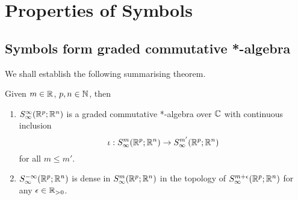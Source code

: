 \documentclass[12pt]{article}
\begin{document}



\section{Properties of Symbols}

\subsection{Symbols form graded commutative *-algebra} 
We shall establish the following summarising theorem. 
\begin{ftheorem}[Summary] \label{theorem : summary for symbol properties}
    Given $m \in {\ensuremath {\mathbb R}}$, $p, n \in {\ensuremath {\mathbb N}}$, then
    \begin{enumerate}
        \item $S^{\infty}_\infty({\mathbb R}^{p}; {\mathbb R}^n)$ is a graded commutative *-algebra over ${\mathbb C}$ with continuous  inclusion  $$\iota : S^{m}_\infty({\mathbb R}^p; {\mathbb R}^n) \to S^{m'}_\infty({\mathbb R}^p; {\mathbb R}^n)$$ for all $m \leq m'$. 
        \item $S^{-\infty}_\infty({\mathbb R}^{p}; {\mathbb R}^n)$ is dense in $S^{m}_\infty({\mathbb R}^{p}; {\mathbb R}^n)$ in the topology of $S^{m + \epsilon}_\infty({\mathbb R}^{p}; {\mathbb R}^n)$ for any $\epsilon \in {\ensuremath {\mathbb R}}_{> 0}$. 
    \end{enumerate}
    
\end{ftheorem}


\end{document}
